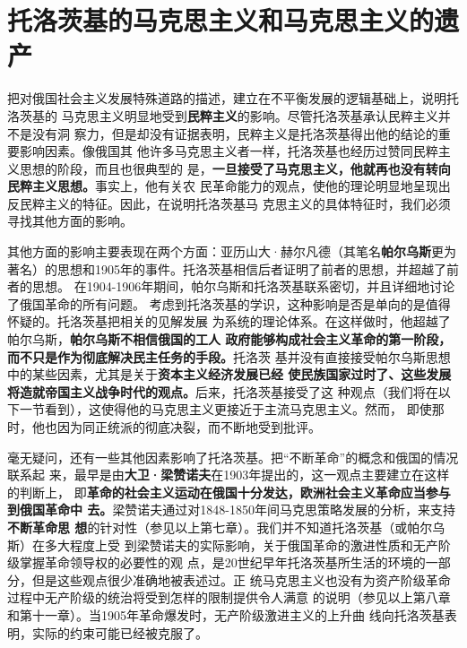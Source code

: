 \section{托洛茨基的马克思主义和马克思主义的遗产}

把对俄国社会主义发展特殊道路的描述，建立在不平衡发展的逻辑基础上，说明托洛茨基的
马克思主义明显地受到\textbf{民粹主义}的影响。尽管托洛茨基承认民粹主义并不是没有洞
察力，但是却没有证据表明，民粹主义是托洛茨基得出他的结论的重要影响因素。像俄国其
他许多马克思主义者一样，托洛茨基也经历过赞同民粹主义思想的阶段，而且也很典型的
是，\textbf{一旦接受了马克思主义，他就再也没有转向民粹主义思想。}事实上，他有关农
民革命能力的观点，使他的理论明显地呈现出反民粹主义的特征。因此，在说明托洛茨基马
克思主义的具体特征时，我们必须寻找其他方面的影响。

其他方面的影响主要表现在两个方面：亚历山大·赫尔凡德（其笔名\textbf{帕尔乌斯}更为
著名）的思想和1905年的事件。托洛茨基相信后者证明了前者的思想，并超越了前者的思想。
在1904-1906年期间，帕尔乌斯和托洛茨基联系密切，并且详细地讨论了俄国革命的所有问题。
考虑到托洛茨基的学识，这种影响是否是单向的是值得怀疑的。托洛茨基把相关的见解发展
为系统的理论体系。在这样做时，他超越了帕尔乌斯，\textbf{帕尔乌斯不相信俄国的工人
  政府能够构成社会主义革命的第一阶段，而不只是作为彻底解决民主任务的手段。}托洛茨
基并没有直接接受帕尔乌斯思想中的某些因素，尤其是关于\textbf{资本主义经济发展已经
  使民族国家过时了、这些发展将造就帝国主义战争时代的观点。}后来，托洛茨基接受了这
种观点（我们将在以下一节看到），这使得他的马克思主义更接近于主流马克思主义。然而，
即使那时，他也因为同正统派的彻底决裂，而不断地受到批评。

毫无疑问，还有一些其他因素影响了托洛茨基。把“不断革命”的概念和俄国的情况联系起
来，最早是由\textbf{大卫·梁赞诺夫}在1903年提出的，这一观点主要建立在这样的判断上，
即\textbf{革命的社会主义运动在俄国十分发达，欧洲社会主义革命应当参与到俄国革命中
  去。}梁赞诺夫通过对1848-1850年间马克思策略发展的分析，来支持\textbf{不断革命思
  想}的针对性（参见以上第七章）。我们并不知道托洛茨基（或帕尔乌斯）在多大程度上受
到梁赞诺夫的实际影响，关于俄国革命的激进性质和无产阶级掌握革命领导权的必要性的观
点，是20世纪早年托洛茨基所生活的环境的一部分，但是这些观点很少准确地被表述过。正
统马克思主义也没有为资产阶级革命过程中无产阶级的统治将受到怎样的限制提供令人满意
的说明（参见以上第八章和第十一章）。当1905年革命爆发时，无产阶级激进主义的上升曲
线向托洛茨基表明，实际的约束可能已经被克服了。

